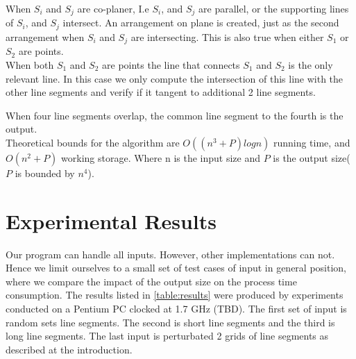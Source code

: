 \documentclass[11pt]{article}
\begin{document}
When $S_i$ and $S_j$ are co-planer, I.e $S_i$, and $S_j$ are parallel, or the 
supporting lines of $S_i$, and $S_j$ intersect. An arrangement on plane is 
created, just as the second arrangement when $S_i$ and $S_j$ are intersecting. 
This is also true when either $S_1$ or $S_2$ are points.\\
When both $S_1$ and $S_2$ are points the line that connects $S_1$ and $S_2$ is
the only relevant line. In this case we only compute the intersection of this 
line with the other line segments and verify if it tangent to additional 2 line
segments.

When four line segments overlap, the common line segment to the fourth is the
output.\\

Theoretical bounds for the algorithm are $O((n^3 + P)log n)$ running time, and 
$O(n^2 + P)$ working storage. Where n is the input size and $P$ is the output 
size($P$ is bounded by $n^4$).

\section{Experimental Results}
Our program can handle all inputs. However, other implementations can not.
Hence  we  limit ourselves to a small set of test cases of input in general 
position, where we compare the impact of the output size on the process time
consumption. The results listed in \ref{table:results} were produced by 
experiments conducted on a Pentium PC clocked at 1.7 GHz (TBD). 
The first set of input is random sets line segments. The second is short line
segments and the third is long line segments.
The last input is perturbated 2 grids of line segments as described at the
introduction.
\end{document}
